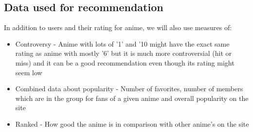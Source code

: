 \subsection{Data used for recommendation}
In addition to users and their rating for anime, we will also use measures of:
\begin{itemize}
\item Controversy - Anime with lots of ’1’ and ’10 might have the exact same rating as anime with mostly ’6’ but it is much more
controversial (hit or miss) and it can be a good recommendation even though its rating might seem low
\item Combined data about popularity - Number of favorites, number of members which are in the group for fans of a given anime and overall popularity on the site
\item Ranked - How good the anime is in  comparison with other anime's on the site 
\end{itemize}





